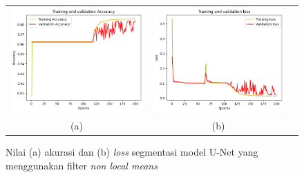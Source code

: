 \begin{enumerate}
	
	\begin{figure}[htbp]
		\centering
		\begin{tabular}{ccc}
			\includegraphics[scale=0.5]{bab4/acc-nlm-unet.png} & 
			\includegraphics[scale=0.5]{bab4/loss-nlm-unet.png} & \\
			(a) & (b)    %
		\end{tabular}
		\caption{Nilai (a) akurasi dan (b) \textit{loss} segmentasi model U-Net yang menggunakan filter \textit{non local means}}
		\label{fig:performance-nlm-unet}
	\end{figure}
	

\end{enumerate}
